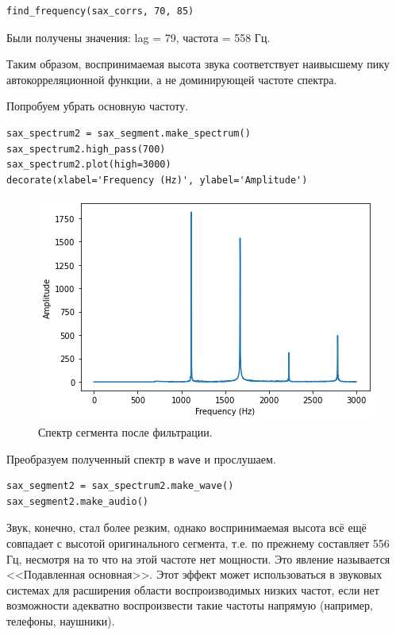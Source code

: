 \documentclass[a4paper, 14pt]{extarticle}
\begin{document}
    \begin{lstlisting}[caption= Поиск пика и его частоты., label={lst:task4_find}]
find_frequency(sax_corrs, 70, 85)   \end{lstlisting}

    Были получены значения: lag = 79, частота = 558 Гц.

    Таким образом, воспринимаемая высота звука соответствует наивысшему пику автокорреляционной функции, а не
    доминирующей частоте спектра.

    Попробуем убрать основную частоту.

    \begin{lstlisting}[caption= Фильтрация частот ниже 700 Гц., label={lst:task4_spectrum_without_fund}]
sax_spectrum2 = sax_segment.make_spectrum()
sax_spectrum2.high_pass(700)
sax_spectrum2.plot(high=3000)
decorate(xlabel='Frequency (Hz)', ylabel='Amplitude')   \end{lstlisting}

    \begin{figure}[h]
        \centering
        \includegraphics[width=0.8\linewidth]{resources/Images/task4_spectrum_without_fund}
        \caption{Спектр сегмента после фильтрации.}
        \label{fig:task4_spectrum_without_fund}
    \end{figure}

    Преобразуем полученный спектр в \texttt{wave} и прослушаем.

    \begin{lstlisting}[caption= Преобразование в \texttt{wave}., label={lst:task4_wave_without_fund}]
sax_segment2 = sax_spectrum2.make_wave()
sax_segment2.make_audio()   \end{lstlisting}

    Звук, конечно, стал более резким, однако воспринимаемая высота всё ещё совпадает с высотой оригинального сегмента,
    т.е. по прежнему составляет 556 Гц, несмотря на то что на этой частоте нет мощности. Это явление называется
    <<Подавленная основная>>. Этот эффект может использоваться в звуковых системах для расширения области воспроизводимых
    низких частот, если нет возможности адекватно воспроизвести такие частоты напрямую (например, телефоны, наушники).
\end{document}
